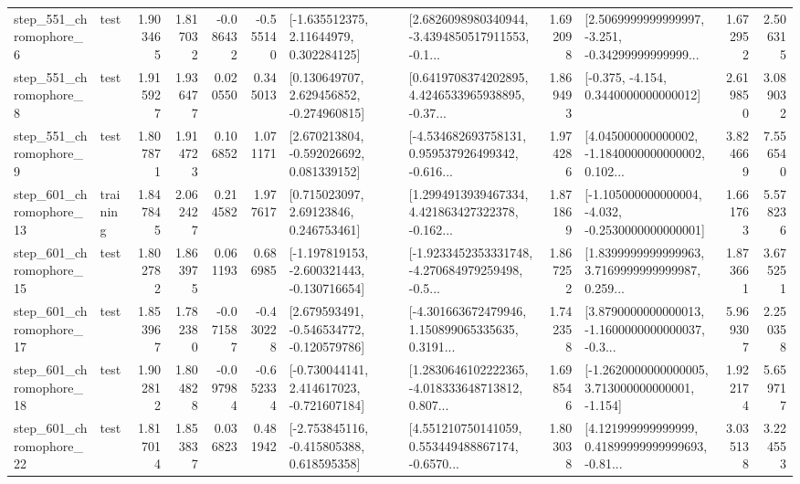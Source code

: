 \begin{tabular}{llrrrrllrlrr}
   step\_551\_chromophore\_6 &      test &      1.903465 &    1.817032 &     -0.086432 & -0.555140 &     [-1.635512375, 2.11644979, 0.302284125] &  [2.6826098980340944, -3.4394850517911553, -0.1... &       1.692098 &  [2.5069999999999997, -3.251, -0.34299999999999... &            1.672952 &          2.506315 \\
   step\_551\_chromophore\_8 &      test &      1.915927 &    1.936477 &      0.020550 &  0.345013 &    [0.130649707, 2.629456852, -0.274960815] &  [0.6419708374202895, 4.4246533965938895, -0.37... &       1.869493 &               [-0.375, -4.154, 0.3440000000000012] &            2.619850 &          3.089032 \\
   step\_551\_chromophore\_9 &      test &      1.807871 &    1.914723 &      0.106852 &  1.071171 &    [2.670213804, -0.592026692, 0.081339152] &  [-4.534682693758131, 0.959537926499342, -0.616... &       1.974286 &  [4.045000000000002, -1.1840000000000002, 0.102... &            3.824669 &          7.556540 \\
  step\_601\_chromophore\_13 &  training &      1.847845 &    2.062427 &      0.214582 &  1.977617 &      [0.715023097, 2.69123846, 0.246753461] &  [1.2994913939467334, 4.421863427322378, -0.162... &       1.871869 &  [-1.105000000000004, -4.032, -0.2530000000000001] &            1.661763 &          5.578236 \\
  step\_601\_chromophore\_15 &      test &      1.802782 &    1.863975 &      0.061193 &  0.686985 &  [-1.197819153, -2.600321443, -0.130716654] &  [-1.9233452353331748, -4.270684979259498, -0.5... &       1.867252 &  [1.8399999999999963, 3.7169999999999987, 0.259... &            1.873661 &          3.675251 \\
  step\_601\_chromophore\_17 &      test &      1.853967 &    1.782380 &     -0.071587 & -0.430228 &   [2.679593491, -0.546534772, -0.120579786] &  [-4.301663672479946, 1.150899065335635, 0.3191... &       1.742358 &  [3.8790000000000013, -1.1600000000000037, -0.3... &            5.969307 &          2.250358 \\
  step\_601\_chromophore\_18 &      test &      1.902812 &    1.804828 &     -0.097984 & -0.652334 &   [-0.730044141, 2.414617023, -0.721607184] &  [1.2830646102222365, -4.018333648713812, 0.807... &       1.698546 &   [-1.2620000000000005, 3.713000000000001, -1.154] &            1.922174 &          5.659717 \\
  step\_601\_chromophore\_22 &      test &      1.817014 &    1.853837 &      0.036823 &  0.481942 &   [-2.753845116, -0.415805388, 0.618595358] &  [4.551210750141059, 0.553449488867174, -0.6570... &       1.803038 &  [4.121999999999999, 0.41899999999999693, -0.81... &            3.035138 &          3.224553 \\

\end{tabular}
